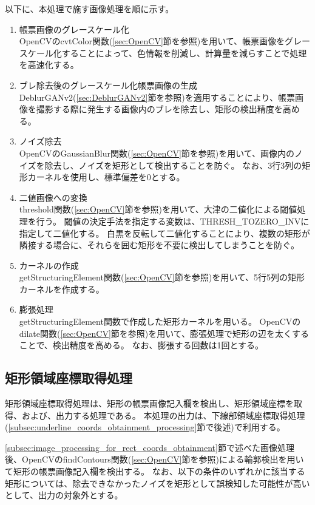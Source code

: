 以下に、本処理で施す画像処理を順に示す。

\begin{enumerate}
    \item 帳票画像のグレースケール化\\
        OpenCVのcvtColor関数(\ref{sec:OpenCV}節を参照)を用いて、帳票画像をグレースケール化することによって、色情報を削減し、計算量を減らすことで処理を高速化する。
    \item ブレ除去後のグレースケール化帳票画像の生成\\
        DeblurGANv2(\ref{sec:DeblurGANv2}節を参照)を適用することにより、帳票画像を撮影する際に発生する画像内のブレを除去し、矩形の検出精度を高める。
    \item ノイズ除去\\
        OpenCVのGaussianBlur関数(\ref{sec:OpenCV}節を参照)を用いて、画像内のノイズを除去し、ノイズを矩形として検出することを防ぐ。
        なお、3行3列の矩形カーネルを使用し、標準偏差を0とする。
    \item 二値画像への変換\\
        threshold関数(\ref{sec:OpenCV}節を参照)を用いて、大津の二値化による閾値処理を行う。
        閾値の決定手法を指定する変数は、THRESH\_TOZERO\_INVに指定して二値化する。
        白黒を反転して二値化することにより、複数の矩形が隣接する場合に、それらを囲む矩形を不要に検出してしまうことを防ぐ。
    \item カーネルの作成\\
        getStructuringElement関数(\ref{sec:OpenCV}節を参照)を用いて、5行5列の矩形カーネルを作成する。
    \item 膨張処理\\
        getStructuringElement関数で作成した矩形カーネルを用いる。
        OpenCVのdilate関数(\ref{sec:OpenCV}節を参照)を用いて、膨張処理で矩形の辺を太くすることで、検出精度を高める。
        なお、膨張する回数は1回とする。
\end{enumerate}


\subsection{矩形領域座標取得処理}\label{subsec:rect_coords_obtainment_processing}
矩形領域座標取得処理は、矩形の帳票画像記入欄を検出し、矩形領域座標を取得、および、出力する処理である。
本処理の出力は、下線部領域座標取得処理(\ref{subsec:underline_coords_obtainment_processing}節で後述)で利用する。

\ref{subsec:image_processing_for_rect_coords_obtainment}節で述べた画像処理後、OpenCVのfindContours関数(\ref{sec:OpenCV}節を参照)による輪郭検出を用いて矩形の帳票画像記入欄を検出する。
なお、以下の条件のいずれかに該当する矩形については、除去できなかったノイズを矩形として誤検知した可能性が高いとして、出力の対象外とする。

